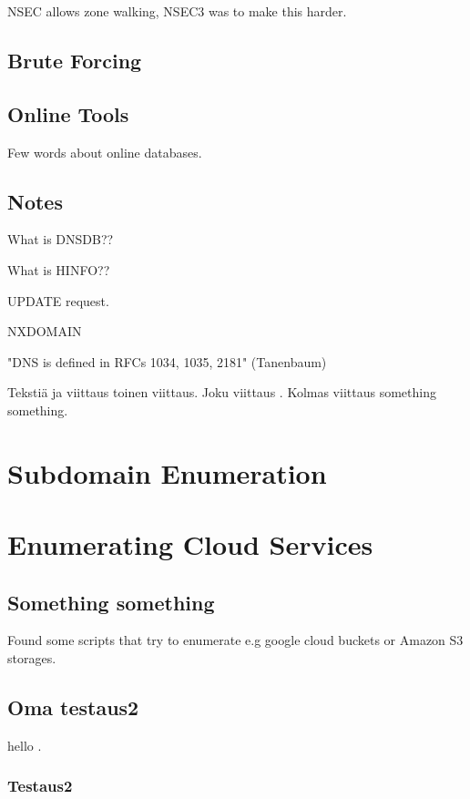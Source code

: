 NSEC allows zone walking, NSEC3 was to make this harder.

\subsection{Brute Forcing}

\subsection{Online Tools}

Few words about online databases.

\subsection{Notes}

What is  DNSDB??

What is HINFO??

UPDATE request.

NXDOMAIN

"DNS is defined in RFCs 1034, 1035, 2181" (Tanenbaum)

Tekstiä ja viittaus \cite{tanenbaum} toinen viittaus.
Joku viittaus \citep{kurose_ross}. Kolmas viittaus
\cite{zone_poisoning} something \cite{dns_privacy} something.

\section{Subdomain Enumeration}


\section{Enumerating Cloud Services}

\subsection{Something something}

Found some scripts that try to enumerate e.g google cloud buckets or Amazon S3 storages.

\subsection{Oma testaus2}

hello \cite{hackers_guide}.

\subsubsection{Testaus2}

